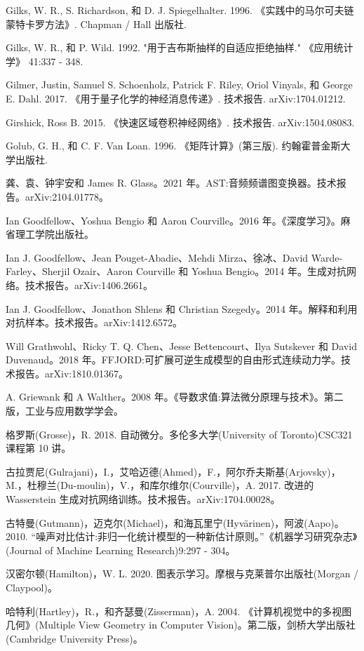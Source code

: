\documentclass[10pt]{article}
\begin{document}
Gilks, W. R., S. Richardson, 和 D. J. Spiegelhalter. 1996. 《实践中的马尔可夫链蒙特卡罗方法》. Chapman / Hall 出版社.

Gilks, W. R., 和 P. Wild. 1992. "用于吉布斯抽样的自适应拒绝抽样." 《应用统计学》 41:337 - 348.

Gilmer, Justin, Samuel S. Schoenholz, Patrick F. Riley, Oriol Vinyals, 和 George E. Dahl. 2017. 《用于量子化学的神经消息传递》. 技术报告. arXiv:1704.01212.

Girshick, Ross B. 2015. 《快速区域卷积神经网络》. 技术报告. arXiv:1504.08083.

Golub, G. H., 和 C. F. Van Loan. 1996. 《矩阵计算》(第三版). 约翰霍普金斯大学出版社.

龚、袁、钟宇安和 James R. Glass。2021 年。AST:音频频谱图变换器。技术报告。arXiv:2104.01778。

Ian Goodfellow、Yoshua Bengio 和 Aaron Courville。2016 年。《深度学习》。麻省理工学院出版社。

Ian J. Goodfellow、Jean Pouget-Abadie、Mehdi Mirza、徐冰、David Warde-Farley、Sherjil Ozair、Aaron Courville 和 Yoshua Bengio。2014 年。生成对抗网络。技术报告。arXiv:1406.2661。

Ian J. Goodfellow、Jonathon Shlens 和 Christian Szegedy。2014 年。解释和利用对抗样本。技术报告。arXiv:1412.6572。

Will Grathwohl、Ricky T. Q. Chen、Jesse Bettencourt、Ilya Sutskever 和 David Duvenaud。2018 年。FFJORD:可扩展可逆生成模型的自由形式连续动力学。技术报告。arXiv:1810.01367。

A. Griewank 和 A Walther。2008 年。《导数求值:算法微分原理与技术》。第二版，工业与应用数学学会。

格罗斯(Grosse)，R. 2018. 自动微分。多伦多大学(University of Toronto)CSC321 课程第 10 讲。

古拉贾尼(Gulrajani)，I.，艾哈迈德(Ahmed)，F.，阿尔乔夫斯基(Arjovsky)，M.，杜穆兰(Du-moulin)，V.，和库尔维尔(Courville)，A. 2017. 改进的 Wasserstein 生成对抗网络训练。技术报告。arXiv:1704.00028。

古特曼(Gutmann)，迈克尔(Michael)，和海瓦里宁(Hyvärinen)，阿波(Aapo)。2010. “噪声对比估计:非归一化统计模型的一种新估计原则。”《机器学习研究杂志》(Journal of Machine Learning Research)9:297 - 304。

汉密尔顿(Hamilton)，W. L. 2020. 图表示学习。摩根与克莱普尔出版社(Morgan / Claypool)。

哈特利(Hartley)，R.，和齐瑟曼(Zisserman)，A. 2004. 《计算机视觉中的多视图几何》(Multiple View Geometry in Computer Vision)。第二版，剑桥大学出版社(Cambridge University Press)。
\end{document}

